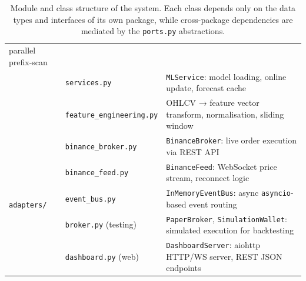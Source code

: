 \begin{table}[H]
\begin{tabular}{|l|p{4.2cm}|p{6.3cm}|}
                                          parallel prefix-scan \\
      & \texttt{services.py}           & \texttt{MLService}: model loading,
                                          online update, forecast cache \\
      & \texttt{feature\_engineering.py} & OHLCV → feature vector transform,
                                            normalisation, sliding window \\
    \hline
    \multirow{5}{*}{\texttt{adapters/}}
      & \texttt{binance\_broker.py}    & \texttt{BinanceBroker}: live order execution
                                          via REST API \\
      & \texttt{binance\_feed.py}      & \texttt{BinanceFeed}: WebSocket price stream,
                                          reconnect logic \\
      & \texttt{event\_bus.py}         & \texttt{InMemoryEventBus}: async
                                          \texttt{asyncio}-based event routing \\
      & \texttt{broker.py} (testing)   & \texttt{PaperBroker}, \texttt{SimulationWallet}:
                                          simulated execution for backtesting \\
      & \texttt{dashboard.py} (web)    & \texttt{DashboardServer}: aiohttp HTTP/WS
                                          server, REST JSON endpoints \\
    \hline
  \end{tabular}
  \caption{Module and class structure of the system. Each class depends only
           on the data types and interfaces of its own package, while cross-package
           dependencies are mediated by the \texttt{ports.py} abstractions.}
  \label{tab:module_structure}
\end{table}
